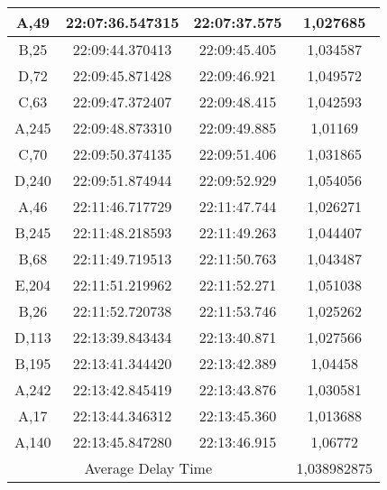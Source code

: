 \begin{table}[!ht]
\begin{tabular}{|ccc|c|}
  \multicolumn{1}{|c|}{A,49}  & \multicolumn{1}{c|}{22:07:36.547315} & 22:07:37.575       & 1,027685    \\ \hline
  \multicolumn{1}{|c|}{B,25}  & \multicolumn{1}{c|}{22:09:44.370413} & 22:09:45.405       & 1,034587    \\ \hline
  \multicolumn{1}{|c|}{D,72}  & \multicolumn{1}{c|}{22:09:45.871428} & 22:09:46.921       & 1,049572    \\ \hline
  \multicolumn{1}{|c|}{C,63}  & \multicolumn{1}{c|}{22:09:47.372407} & 22:09:48.415       & 1,042593    \\ \hline
  \multicolumn{1}{|c|}{A,245} & \multicolumn{1}{c|}{22:09:48.873310} & 22:09:49.885       & 1,01169     \\ \hline
  \multicolumn{1}{|c|}{C,70}  & \multicolumn{1}{c|}{22:09:50.374135} & 22:09:51.406       & 1,031865    \\ \hline
  \multicolumn{1}{|c|}{D,240} & \multicolumn{1}{c|}{22:09:51.874944} & 22:09:52.929       & 1,054056    \\ \hline
  \multicolumn{1}{|c|}{A,46}  & \multicolumn{1}{c|}{22:11:46.717729} & 22:11:47.744       & 1,026271    \\ \hline
  \multicolumn{1}{|c|}{B,245} & \multicolumn{1}{c|}{22:11:48.218593} & 22:11:49.263       & 1,044407    \\ \hline
  \multicolumn{1}{|c|}{B,68}  & \multicolumn{1}{c|}{22:11:49.719513} & 22:11:50.763       & 1,043487    \\ \hline
  \multicolumn{1}{|c|}{E,204} & \multicolumn{1}{c|}{22:11:51.219962} & 22:11:52.271       & 1,051038    \\ \hline
  \multicolumn{1}{|c|}{B,26}  & \multicolumn{1}{c|}{22:11:52.720738} & 22:11:53.746       & 1,025262    \\ \hline
  \multicolumn{1}{|c|}{D,113} & \multicolumn{1}{c|}{22:13:39.843434} & 22:13:40.871       & 1,027566    \\ \hline
  \multicolumn{1}{|c|}{B,195} & \multicolumn{1}{c|}{22:13:41.344420} & 22:13:42.389       & 1,04458     \\ \hline
  \multicolumn{1}{|c|}{A,242} & \multicolumn{1}{c|}{22:13:42.845419} & 22:13:43.876       & 1,030581    \\ \hline
  \multicolumn{1}{|c|}{A,17}  & \multicolumn{1}{c|}{22:13:44.346312} & 22:13:45.360       & 1,013688    \\ \hline
  \multicolumn{1}{|c|}{A,140} & \multicolumn{1}{c|}{22:13:45.847280} & 22:13:46.915       & 1,06772     \\ \hline
  \multicolumn{3}{|c|}{Average Delay Time}                                                & 1,038982875 \\ \hline
  \end{tabular}
\end{table}

